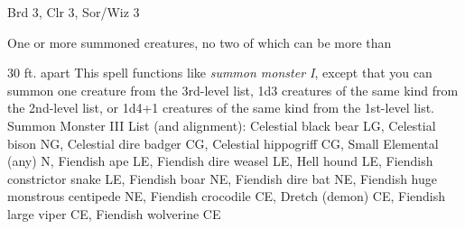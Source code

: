 
\begin{description*}
\item[Level:] Brd 3, Clr 3, Sor/Wiz 3
\item[Effect:] One or more summoned creatures, no two of which can be more than
\end{description*}

30 ft. apart
This spell functions like \textit{summon monster I}, except that you can summon
one creature from the 3rd-level list, 1d3 creatures of the same kind from the 2nd-level
list, or 1d4+1 creatures of the same kind from the 1st-level list.
Summon Monster III List (and alignment): Celestial black bear LG, Celestial bison NG, Celestial dire badger CG, Celestial hippogriff CG, Small Elemental (any) N, Fiendish ape LE, Fiendish dire weasel LE, Hell hound LE, Fiendish constrictor snake LE, Fiendish boar NE, Fiendish dire bat NE, Fiendish huge monstrous centipede NE, Fiendish crocodile CE, Dretch (demon) CE, Fiendish large viper CE, Fiendish wolverine CE